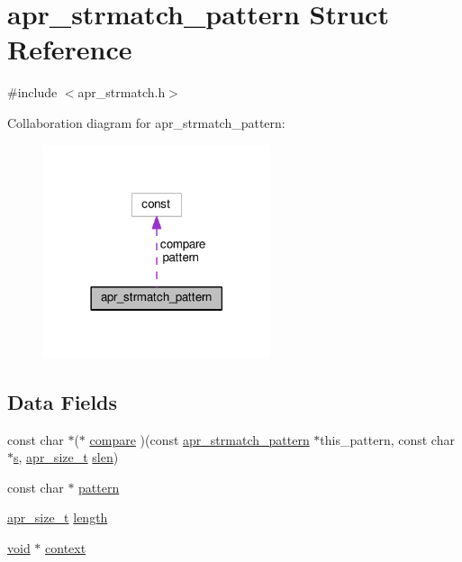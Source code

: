 \hypertarget{structapr__strmatch__pattern}{}\section{apr\+\_\+strmatch\+\_\+pattern Struct Reference}
\label{structapr__strmatch__pattern}


{\ttfamily \#include $<$apr\+\_\+strmatch.\+h$>$}



Collaboration diagram for apr\+\_\+strmatch\+\_\+pattern\+:
\nopagebreak
\begin{figure}[H]
\begin{center}
\leavevmode
\includegraphics[width=189pt]{structapr__strmatch__pattern__coll__graph}
\end{center}
\end{figure}
\subsection*{Data Fields}
\begin{DoxyCompactItemize}
\item 
const char $\ast$($\ast$ \hyperlink{structapr__strmatch__pattern_aded054f3d6701a163816e3ed7f257242}{compare} )(const \hyperlink{structapr__strmatch__pattern}{apr\+\_\+strmatch\+\_\+pattern} $\ast$this\+\_\+pattern, const char $\ast$\hyperlink{pcretest_8txt_a062597889ba244b72877454b1d3adecf}{s}, \hyperlink{group__apr__platform_gaaa72b2253f6f3032cefea5712a27540e}{apr\+\_\+size\+\_\+t} \hyperlink{group__APR__Util__Escaping_ga00eba03f583932b8cdcec6e0847f08b3}{slen})
\item 
const char $\ast$ \hyperlink{structapr__strmatch__pattern_ad219bd7708d7be5937cb79e7cfda01c0}{pattern}
\item 
\hyperlink{group__apr__platform_gaaa72b2253f6f3032cefea5712a27540e}{apr\+\_\+size\+\_\+t} \hyperlink{structapr__strmatch__pattern_a4b1f44db089850f396bc4bedac0fb25c}{length}
\item 
\hyperlink{group__MOD__ISAPI_gacd6cdbf73df3d9eed42fa493d9b621a6}{void} $\ast$ \hyperlink{structapr__strmatch__pattern_a0e74c401e8825e462e202175bf033a9c}{context}
\end{DoxyCompactItemize}


